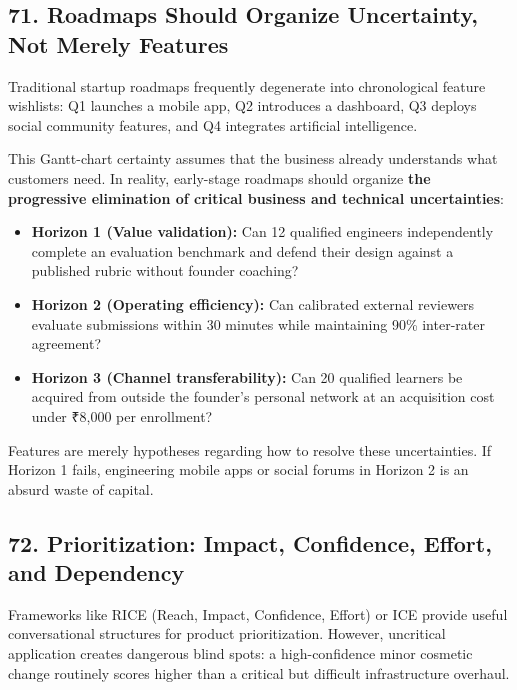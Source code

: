 \subsection*{71. Roadmaps Should Organize Uncertainty, Not Merely Features}

Traditional startup roadmaps frequently degenerate into chronological feature wishlists: Q1 launches a mobile app, Q2 introduces a dashboard, Q3 deploys social community features, and Q4 integrates artificial intelligence.

This Gantt-chart certainty assumes that the business already understands what customers need. In reality, early-stage roadmaps should organize \textbf{the progressive elimination of critical business and technical uncertainties}:
\begin{itemize}
    \item \textbf{Horizon 1 (Value validation):} Can 12 qualified engineers independently complete an evaluation benchmark and defend their design against a published rubric without founder coaching?
    \item \textbf{Horizon 2 (Operating efficiency):} Can calibrated external reviewers evaluate submissions within 30 minutes while maintaining 90\% inter-rater agreement?
    \item \textbf{Horizon 3 (Channel transferability):} Can 20 qualified learners be acquired from outside the founder's personal network at an acquisition cost under ₹8,000 per enrollment?
\end{itemize}

Features are merely hypotheses regarding how to resolve these uncertainties. If Horizon 1 fails, engineering mobile apps or social forums in Horizon 2 is an absurd waste of capital.

\subsection*{72. Prioritization: Impact, Confidence, Effort, and Dependency}

Frameworks like RICE (Reach, Impact, Confidence, Effort) or ICE provide useful conversational structures for product prioritization. However, uncritical application creates dangerous blind spots: a high-confidence minor cosmetic change routinely scores higher than a critical but difficult infrastructure overhaul.

